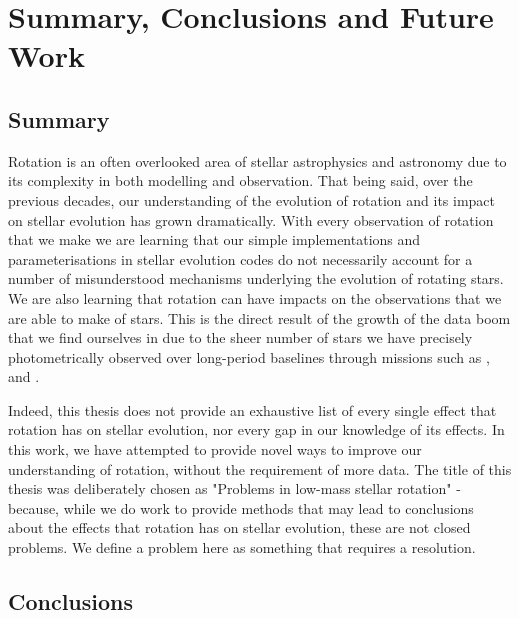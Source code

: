 \newcommand{\todo}[1]{\textcolor{red}{#1}}

\chapter{Summary, Conclusions and Future Work}
\label{chap:conc}

\section{Summary}

Rotation is an often overlooked area of stellar astrophysics and astronomy due to its complexity in both modelling and observation.
That being said, over the previous decades, our understanding of the evolution of rotation and its impact on stellar evolution has grown dramatically.
With every observation of rotation that we make we are learning that our simple implementations and parameterisations in stellar evolution codes do not necessarily account for a number of misunderstood mechanisms underlying the evolution of rotating stars.
We are also learning that rotation can have impacts on the observations that we are able to make of stars.
This is the direct result of the growth of the data boom that we find ourselves in due to the sheer number of stars we have precisely photometrically observed over long-period baselines through missions such as \kepler, \ktoo and \tess.

Indeed, this thesis does not provide an exhaustive list of every single effect that rotation has on stellar evolution, nor every gap in our knowledge of its effects.
In this work, we have attempted to provide novel ways to improve our understanding of rotation, without the requirement of more data.
The title of this thesis was deliberately chosen as "Problems in low-mass stellar rotation" - because, while we do work to provide methods that may lead to conclusions about the effects that rotation has on stellar evolution, these are not closed problems.
We define a problem here as something that requires a resolution.

\section{Conclusions}

